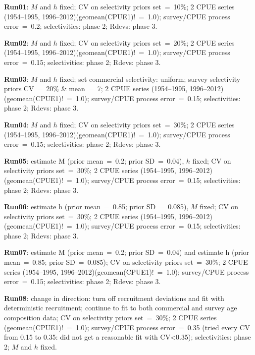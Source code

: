 

{\bf Run01}: $M$ and $h$ fixed; CV on selectivity priors set~=~10\%; 2 CPUE series (1954--1995, 1996--2012)(geomean(CPUE1)!~=~1.0); survey/CPUE process error~=~0.2; selectivities: phase 2; Rdevs: phase 3. \newline 

{\bf Run02}: $M$ and $h$ fixed; CV on selectivity priors set~=~20\%; 2 CPUE series (1954--1995, 1996--2012)(geomean(CPUE1)!~=~1.0); survey/CPUE process error~=~0.15; selectivities: phase 2; Rdevs: phase 3. \newline

{\bf Run03}: $M$ and $h$ fixed; set commercial selectivity: uniform; survey selectivity priors CV~=~20\% \& mean~=~7; 2 CPUE series (1954--1995, 1996--2012)(geomean(CPUE1)!~=~1.0); survey/CPUE process error~=~0.15; selectivities: phase 2; Rdevs: phase 3. \newline

{\bf Run04}: $M$ and $h$ fixed; CV on selectivity priors set~=~30\%; 2 CPUE series (1954--1995, 1996--2012)(geomean(CPUE1)!~=~1.0); survey/CPUE process error~=~0.15; selectivities: phase 2; Rdevs: phase 3. \newline

{\bf Run05}: estimate M (prior mean~=~0.2; prior SD~=~0.04), $h$ fixed; CV on selectivity priors set~=~30\%; 2 CPUE series (1954--1995, 1996--2012)(geomean(CPUE1)!~=~1.0); survey/CPUE process error~=~0.15; selectivities: phase 2; Rdevs: phase 3.  \newline

{\bf Run06}: estimate h (prior mean~=~0.85; prior SD~=~0.085), $M$ fixed; CV on selectivity priors set~=~30\%; 2 CPUE series (1954--1995, 1996--2012)(geomean(CPUE1)!~=~1.0); survey/CPUE process error~=~0.15; selectivities: phase 2; Rdevs: phase 3. \newline

{\bf Run07}: estimate M (prior mean~=~0.2; prior SD~=~0.04) and estimate h (prior mean~=~0.85; prior SD~=~0.085); CV on selectivity priors set~=~30\%; 2 CPUE series (1954--1995, 1996--2012)(geomean(CPUE1)!~=~1.0); survey/CPUE process error~=~0.15; selectivities: phase 2; Rdevs: phase 3. \newline

{\bf Run08}: change in direction: turn off recruitment deviations and fit with deterministic recruitment; continue to fit to both commercial and survey age composition data; CV on selectivity priors set~=~30\%; 2 CPUE series (geomean(CPUE1)!~=~1.0); survey/CPUE process error~=~0.35 (tried every CV from 0.15 to 0.35: did not get a reasonable fit with CV<0.35); selectivities: phase 2; $M$ and $h$ fixed. \newline

